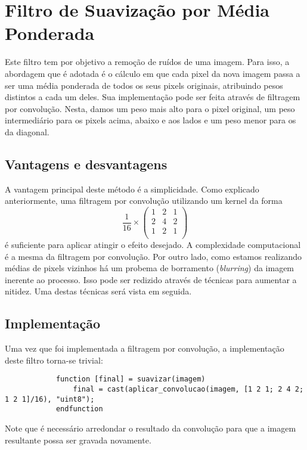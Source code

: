 \documentclass[brazil,times]{abnt}
\begin{document}
	
	\section{Filtro de Suavização por Média Ponderada}
		Este filtro tem por objetivo a remoção de ruídos de uma imagem. Para isso, a abordagem que é adotada é o cálculo em que cada pixel da nova imagem passa a ser uma média ponderada de todos os seus pixels originais, atribuindo pesos distintos a cada um deles. Sua implementação pode ser feita através de filtragem por convolução. Nesta, damos um peso mais alto para o pixel original, um peso intermediário para os pixels acima, abaixo e aos lados e um peso menor para os da diagonal.
	
		\subsection{Vantagens e desvantagens}
			A vantagem principal deste método é a simplicidade. Como explicado anteriormente, uma filtragem por convolução utilizando um kernel da forma 
\[
 \frac{1}{16} \times 
 \begin{pmatrix}
  1 & 2 & 1 \\
  2 & 4 & 2 \\
  1 & 2 & 1 \\
 \end{pmatrix}
\]
		é suficiente para aplicar atingir o efeito desejado. A complexidade computacional é a mesma da filtragem por convolução. Por outro lado, como estamos realizando médias de pixels vizinhos há um probema de borramento (\emph{blurring}) da imagem inerente ao processo. Isso pode ser redizido através de técnicas para aumentar a nitidez. Uma destas técnicas será vista em seguida.
		
		\subsection{Implementação}
			Uma vez que foi implementada a filtragem por convolução, a implementação deste filtro torna-se trivial:
			
			\begin{lstlisting}
			function [final] = suavizar(imagem)
			    final = cast(aplicar_convolucao(imagem, [1 2 1; 2 4 2; 1 2 1]/16), "uint8");
			endfunction
			\end{lstlisting}
			
			Note que é necessário arredondar o resultado da convolução para que a imagem resultante possa ser gravada novamente.
		
\end{document}
